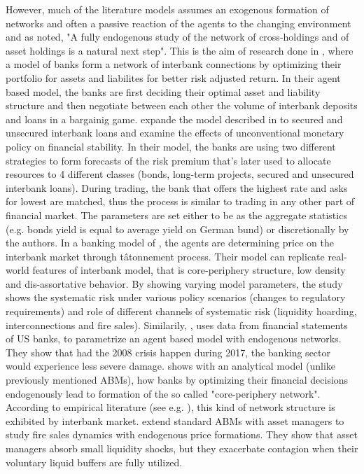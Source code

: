\documentclass{article}
\begin{document}
However, much of the literature models assumes an exogenous formation of networks and often a passive reaction of the agents to the changing environment and as \citet{elliot} noted, "A fully endogenous study
of the network of cross-holdings and of asset holdings is a natural next step". This is the aim of research done in \cite{halaj}, where a model of banks form a network of interbank connections by optimizing their portfolio for assets and liabilites for better risk adjusted return. In their agent based model, the banks are first deciding their optimal asset and liability structure and then negotiate between each other the volume of interbank deposits and loans in a bargainig game. \citet{wolski} expande the model described in \citet{halaj} to secured and unsecured interbank loans and examine the effects of unconventional monetary policy on financial stability. In their model, the banks are using two different strategies to form forecasts of the risk premium that's later used to allocate resources to 4 different classes (bonds, long-term projects, secured and unsecured interbank loans). During trading, the bank that offers the highest rate and asks for lowest are matched, thus the process is similar to trading in any other part of financial market. The parameters are set either to be as the aggregate statistics (e.g. bonds yield is equal to average yield on German bund) or discretionally by the authors. In a banking model of \citet{aldasoro}, the agents are determining price on the interbank market through tâtonnement process. Their model can replicate real-world features of interbank model, that is core-periphery structure, low density and dis-assortative behavior. By showing varying model parameters, the study shows the systematic risk under various policy scenarios (changes to regulatory requirements) and role of different channels of systematic risk (liquidity hoarding, interconnections and fire sales). Similarily, \citet{liu}, uses data from financial statements of US banks, to parametrize an agent based model with endogenous networks. They show that had the 2008 crisis happen during 2017, the banking sector would experience less severe damage. \citet{NBERw29467} shows with an analytical model (unlike previously mentioned ABMs), how banks by optimizing their financial decisions endogenously lead to formation of the so called "core-periphery network". According to empirical literature (see e.g. \citet{intveld}), this kind of network structure is exhibited by interbank market. \citet{calimani} extend standard ABMs with asset managers to study fire sales dynamics with endogenous price formations. They show that asset managers absorb small liquidity shocks, but they exacerbate contagion when their voluntary liquid buffers are fully utilized.
\end{document}
